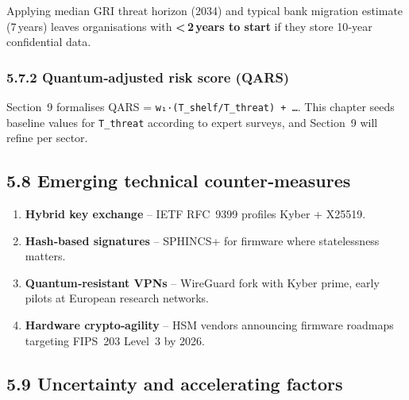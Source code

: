 \documentclass[
  english,
]{article}
\providecommand{\tightlist}{%
  \setlength{\itemsep}{0pt}\setlength{\parskip}{0pt}}
\begin{document}
Applying median GRI threat horizon (2034) and typical bank migration
estimate (7\,years) leaves organisations with
\textbf{\textless\,2\,years to start} if they store 10‑year confidential
data.

\subsubsection{5.7.2 Quantum‑adjusted risk score
(QARS)}\label{quantumadjusted-risk-score-qars}

Section~9 formalises QARS = \texttt{w₁·(T\_shelf/T\_threat)\ +\ …}. This
chapter seeds baseline values for \texttt{T\_threat} according to expert
surveys, and Section~9 will refine per sector.

\subsection{5.8 Emerging technical
counter‑measures}\label{emerging-technical-countermeasures}

\begin{enumerate}
\def\labelenumi{\arabic{enumi}.}
\tightlist
\item
  \textbf{Hybrid key exchange} -- IETF RFC~9399 profiles Kyber + X25519.
\item
  \textbf{Hash‑based signatures} -- SPHINCS+ for firmware where
  statelessness matters.
\item
  \textbf{Quantum‑resistant VPNs} -- WireGuard fork with Kyber prime,
  early pilots at European research networks.
\item
  \textbf{Hardware crypto‑agility} -- HSM vendors announcing firmware
  roadmaps targeting FIPS~203 Level~3 by 2026.
\end{enumerate}

\subsection{5.9 Uncertainty and accelerating
factors}\label{uncertainty-and-accelerating-factors}
\end{document}
